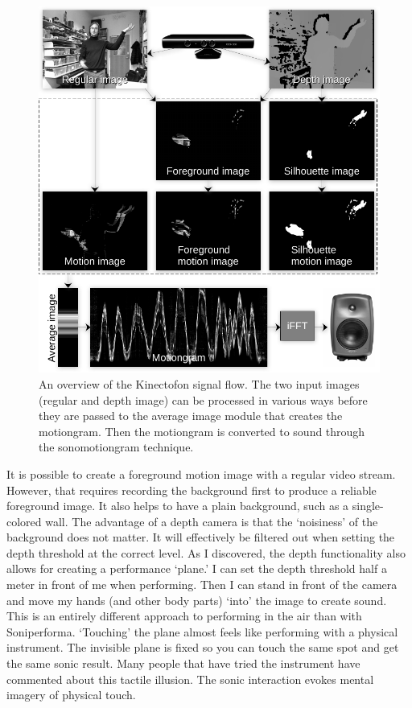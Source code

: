 \begin{figure}[tbp]
		\includegraphics[width=\textwidth]{figures/73-kinectofon-crop.pdf}
	\caption{An overview of the Kinectofon signal flow. The two input images (regular and depth image) can be processed in various ways before they are passed to the average image module that creates the motiongram. Then the motiongram is converted to sound through the sonomotiongram technique.}
	\label{fig:figures_overview_overview}
\end{figure}

It is possible to create a foreground motion image with a regular video stream. However, that requires recording the background first to produce a reliable foreground image. It also helps to have a plain background, such as a single-colored wall. The advantage of a depth camera is that the `noisiness' of the background does not matter. It will effectively be filtered out when setting the depth threshold at the correct level. As I discovered, the depth functionality also allows for creating a performance `plane.' I can set the depth threshold half a meter in front of me when performing. Then I can stand in front of the camera and move my hands (and other body parts) `into' the image to create sound. This is an entirely different approach to performing in the air than with Soniperforma. `Touching' the plane almost feels like performing with a physical instrument. The invisible plane is fixed so you can touch the same spot and get the same sonic result. Many people that have tried the instrument have commented about this tactile illusion. The sonic interaction evokes mental imagery of physical touch.


